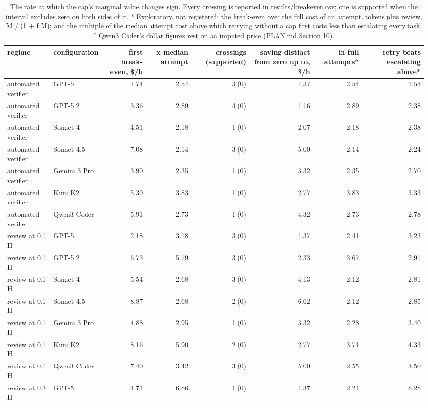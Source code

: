 \begin{table}[t]
\centering
\small
\caption{The rate at which the cap's marginal value changes sign. Every crossing is reported in results/breakeven.csv; one is supported when the interval excludes zero on both sides of it. * Exploratory, not registered: the break-even over the full cost of an attempt, tokens plus review, M / (1 + f M); and the multiple of the median attempt cost above which retrying without a cap first costs less than escalating every task. $^\dagger$ Qwen3 Coder's dollar figures rest on an imputed price (PLAN.md Section 10).}
\label{tab:table2_breakeven}
\begin{tabular}{llrrrrrr}
\toprule
regime & configuration & first break-even, \$/h & x median attempt & crossings (supported) & saving distinct from zero up to, \$/h & in full attempts* & retry beats escalating above* \\
\midrule
automated verifier & GPT-5 & 1.74 & 2.54 & 3 (0) & 1.37 & 2.54 & 2.53 \\
automated verifier & GPT-5.2 & 3.36 & 2.89 & 4 (0) & 1.16 & 2.89 & 2.38 \\
automated verifier & Sonnet 4 & 4.51 & 2.18 & 1 (0) & 2.07 & 2.18 & 2.38 \\
automated verifier & Sonnet 4.5 & 7.08 & 2.14 & 3 (0) & 5.00 & 2.14 & 2.24 \\
automated verifier & Gemini 3 Pro & 3.90 & 2.35 & 1 (0) & 3.32 & 2.35 & 2.70 \\
automated verifier & Kimi K2 & 5.30 & 3.83 & 1 (0) & 2.77 & 3.83 & 3.33 \\
automated verifier & Qwen3 Coder$^\dagger$ & 5.91 & 2.73 & 1 (0) & 4.32 & 2.73 & 2.78 \\
\midrule
review at 0.1 H & GPT-5 & 2.18 & 3.18 & 3 (0) & 1.37 & 2.41 & 3.23 \\
review at 0.1 H & GPT-5.2 & 6.73 & 5.79 & 3 (0) & 2.33 & 3.67 & 2.91 \\
review at 0.1 H & Sonnet 4 & 5.54 & 2.68 & 3 (0) & 4.13 & 2.12 & 2.81 \\
review at 0.1 H & Sonnet 4.5 & 8.87 & 2.68 & 2 (0) & 6.62 & 2.12 & 2.85 \\
review at 0.1 H & Gemini 3 Pro & 4.88 & 2.95 & 1 (0) & 3.32 & 2.28 & 3.40 \\
review at 0.1 H & Kimi K2 & 8.16 & 5.90 & 2 (0) & 2.77 & 3.71 & 4.33 \\
review at 0.1 H & Qwen3 Coder$^\dagger$ & 7.40 & 3.42 & 3 (0) & 5.00 & 2.55 & 3.50 \\
\midrule
review at 0.3 H & GPT-5 & 4.71 & 6.86 & 1 (0) & 1.37 & 2.24 & 8.28 \\

\end{tabular}
\end{table}
